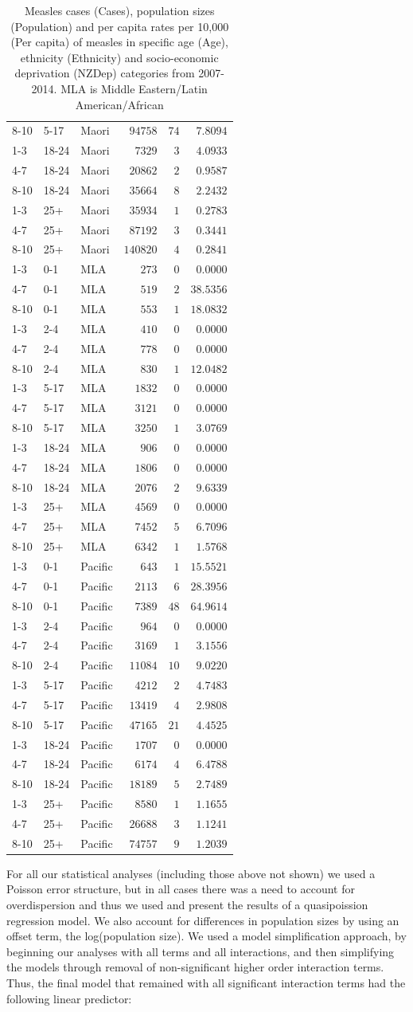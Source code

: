 \documentclass{article}
\begin{document}
\begin{table}[hbtp]
\begin{center}
\begin{tabular}{lllrrr}
8-10&5-17&Maori&$ 94758$&$ 74$&$ 7.8094$\tabularnewline
1-3&18-24&Maori&$  7329$&$  3$&$ 4.0933$\tabularnewline
4-7&18-24&Maori&$ 20862$&$  2$&$ 0.9587$\tabularnewline
8-10&18-24&Maori&$ 35664$&$  8$&$ 2.2432$\tabularnewline
1-3&25+&Maori&$ 35934$&$  1$&$ 0.2783$\tabularnewline
4-7&25+&Maori&$ 87192$&$  3$&$ 0.3441$\tabularnewline
8-10&25+&Maori&$140820$&$  4$&$ 0.2841$\tabularnewline
1-3&0-1&MLA&$   273$&$  0$&$ 0.0000$\tabularnewline
4-7&0-1&MLA&$   519$&$  2$&$38.5356$\tabularnewline
8-10&0-1&MLA&$   553$&$  1$&$18.0832$\tabularnewline
1-3&2-4&MLA&$   410$&$  0$&$ 0.0000$\tabularnewline
4-7&2-4&MLA&$   778$&$  0$&$ 0.0000$\tabularnewline
8-10&2-4&MLA&$   830$&$  1$&$12.0482$\tabularnewline
1-3&5-17&MLA&$  1832$&$  0$&$ 0.0000$\tabularnewline
4-7&5-17&MLA&$  3121$&$  0$&$ 0.0000$\tabularnewline
8-10&5-17&MLA&$  3250$&$  1$&$ 3.0769$\tabularnewline
1-3&18-24&MLA&$   906$&$  0$&$ 0.0000$\tabularnewline
4-7&18-24&MLA&$  1806$&$  0$&$ 0.0000$\tabularnewline
8-10&18-24&MLA&$  2076$&$  2$&$ 9.6339$\tabularnewline
1-3&25+&MLA&$  4569$&$  0$&$ 0.0000$\tabularnewline
4-7&25+&MLA&$  7452$&$  5$&$ 6.7096$\tabularnewline
8-10&25+&MLA&$  6342$&$  1$&$ 1.5768$\tabularnewline
1-3&0-1&Pacific&$   643$&$  1$&$15.5521$\tabularnewline
4-7&0-1&Pacific&$  2113$&$  6$&$28.3956$\tabularnewline
8-10&0-1&Pacific&$  7389$&$ 48$&$64.9614$\tabularnewline
1-3&2-4&Pacific&$   964$&$  0$&$ 0.0000$\tabularnewline
4-7&2-4&Pacific&$  3169$&$  1$&$ 3.1556$\tabularnewline
8-10&2-4&Pacific&$ 11084$&$ 10$&$ 9.0220$\tabularnewline
1-3&5-17&Pacific&$  4212$&$  2$&$ 4.7483$\tabularnewline
4-7&5-17&Pacific&$ 13419$&$  4$&$ 2.9808$\tabularnewline
8-10&5-17&Pacific&$ 47165$&$ 21$&$ 4.4525$\tabularnewline
1-3&18-24&Pacific&$  1707$&$  0$&$ 0.0000$\tabularnewline
4-7&18-24&Pacific&$  6174$&$  4$&$ 6.4788$\tabularnewline
8-10&18-24&Pacific&$ 18189$&$  5$&$ 2.7489$\tabularnewline
1-3&25+&Pacific&$  8580$&$  1$&$ 1.1655$\tabularnewline
4-7&25+&Pacific&$ 26688$&$  3$&$ 1.1241$\tabularnewline
8-10&25+&Pacific&$ 74757$&$  9$&$ 1.2039$\tabularnewline
\hline
\end{tabular}\end{center}\caption{Measles cases (Cases), population sizes (Population) and per capita rates per 10,000 (Per capita) of measles in specific age (Age), ethnicity (Ethnicity) and socio-economic deprivation (NZDep) categories from 2007-2014. MLA is Middle Eastern/Latin American/African}
\label{table:percap}
\end{table}

For all our statistical analyses (including those above not shown) we used a Poisson error structure, but in all cases there was a need to account for overdispersion and thus we used and present the results of a quasipoission regression model. We also account for differences in population sizes by using an offset term, the log(population size). We used a model simplification approach, by beginning our analyses with all terms and all interactions, and then simplifying the models through removal of non-significant higher order interaction terms. Thus, the final model that remained with all significant interaction terms had the following linear predictor:
\end{document}
